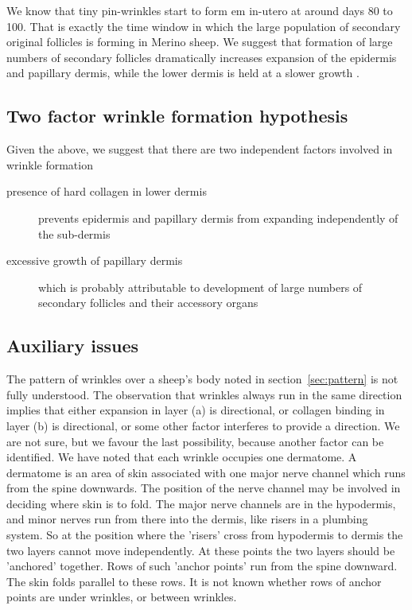 \documentclass[]{interact}
\theoremstyle{plain}%
\theoremstyle{definition}
\theoremstyle{remark}
\begin{document}
We know that tiny pin-wrinkles start to form {em in-utero} at around days 80 to 100. That is exactly the time window in which the large population of secondary original follicles is forming in Merino sheep. We suggest that formation of large numbers of secondary follicles dramatically increases expansion of the epidermis and papillary dermis, while the lower dermis is held at a slower growth .

\subsection{Two factor wrinkle formation hypothesis}
Given the above, we suggest that there are two independent factors involved in wrinkle formation
\begin{description}
\item[presence of hard collagen in lower dermis] prevents epidermis and papillary dermis from expanding independently of the sub-dermis
\item[excessive growth of papillary dermis] which is probably attributable to development of large numbers of secondary follicles and their accessory organs
\end{description}
 
\subsection{Auxiliary issues}
 The pattern of wrinkles over a sheep's body noted in section~\ref{sec:pattern} is not fully understood. The observation that wrinkles always run in the same direction implies that either expansion in layer (a) is directional, or collagen binding in layer (b) is directional, or some other factor interferes to provide a direction. We are not sure, but we favour the last possibility, because another factor can be identified. We have noted that each wrinkle occupies one dermatome. A dermatome is an area of skin associated with one major nerve channel which runs from the spine downwards. The position of the nerve channel may be involved in deciding where skin is to fold. The major nerve channels are in the hypodermis, and minor nerves run from there into the dermis, like risers in a plumbing system. So at the position where the 'risers' cross from hypodermis to dermis the two layers cannot move independently. At these points the two layers should be 'anchored' together. Rows of such 'anchor points' run from the spine downward. The skin folds parallel to these rows. It is not known whether rows of anchor points are under wrinkles, or between wrinkles. 
\end{document}

